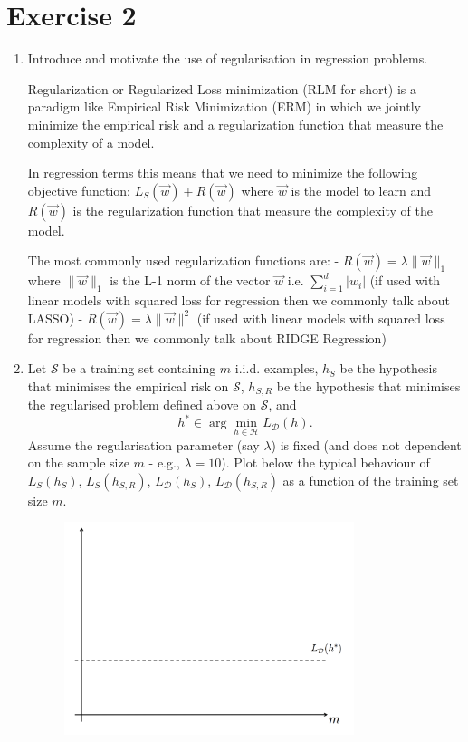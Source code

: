\documentclass[a4paper,11pt,oneside]{book}
\begin{document}
\section{Exercise 2}
    \begin{enumerate}
        \item Introduce and motivate the use of regularisation in regression problems.
            \begin{solution}
                Regularization or Regularized Loss minimization (RLM for short) is a paradigm like Empirical Risk Minimization (ERM) in which we jointly minimize the empirical risk and a regularization function that measure the complexity of a model.
                
                In regression terms this means that we need to minimize the following objective function: $L_S(\vec{w}) + R(\vec{w})$ where $\vec{w}$ is the model to learn and $R(\vec{w})$ is the regularization function that measure the complexity of the model.
                
                The most commonly used regularization functions are:
                - $R(\vec{w}) = \lambda\|\vec{w}\|_1$ where $\|\vec{w}\|_1$ is the L-1 norm of the vector $\vec{w}$ i.e. $\sum_{i=1}^d |w_i|$ (if used with linear models with squared loss for regression then we commonly talk about LASSO)
                - $R(\vec{w}) = \lambda\|\vec{w}\|^2$ (if used with linear models with squared loss for regression then we commonly talk about RIDGE Regression)
            \end{solution}
        \clearpage
        \item Let $\mathcal{S}$ be a training set containing $m$ i.i.d. examples, $h_S$ be the hypothesis that minimises the empirical risk on $\mathcal{S}$, $h_{S,R}$ be the hypothesis that minimises the regularised problem defined above on $\mathcal{S}$, and
            $$h^* \in \arg\min_{h\in\mathcal{H}} L_\mathcal{D}(h).$$
            Assume the regularisation parameter (say $\lambda$) is fixed (and does not dependent on the sample size $m$ - e.g., $\lambda = 10$). Plot below the typical behaviour of $L_S(h_S)$, $L_S(h_{S,R})$, $L_\mathcal{D}(h_S)$, $L_\mathcal{D}(h_{S,R})$ as a function of the training set size $m$.
            \begin{figure}[H]
                \centering
                \includegraphics[width=0.8\textwidth,height=0.7\textheight,keepaspectratio]{images/2_29_Jan_2018.png}
            \end{figure}


\end{enumerate}
\end{document}

